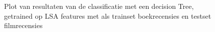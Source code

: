 \begin{figure}%
    \centering
    \caption{Plot van resultaten van de classificatie met een decision Tree, getrained op LSA features met als trainset boekrecensies en testset filmrecensies}
    \label{fig:example}%
\end{figure}
%  

